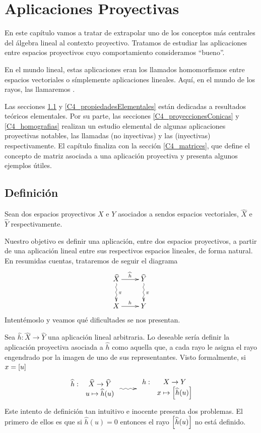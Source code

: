 \chapter{Aplicaciones Proyectivas}
\label{C4}
En este capítulo vamos a tratar de extrapolar uno de los conceptos más centrales del álgebra lineal al contexto proyectivo. Tratamos de estudiar las aplicaciones entre espacios proyectivos cuyo comportamiento consideramos ``bueno''.

En el mundo lineal, estas aplicaciones eran los llamados homomorfismos entre espacios vectoriales o símplemente aplicaciones lineales. Aquí, en el mundo de los rayos, las llamaremos .

Las secciones \ref{C4_definicion} y \ref{C4_propiedadesElementales} están dedicadas a resultados teóricos elementales. Por su parte, las secciones \ref{C4_proyeccionesConicas} y \ref{C4_homografias} realizan un estudio elemental de algunas aplicaciones proyectivas notables, las llamadas  (no inyectivas) y las  (inyectivas) respectivamente. El capítulo finaliza con la sección \ref{C4_matrices}, que define el concepto de matriz asociada a una aplicación proyectiva y presenta algunos ejemplos útiles.
\section{Definición}
\label{C4_definicion}
Sean dos espacios proyectivos $X$ e $Y$ asociados a sendos espacios vectoriales, $\widehat{X}$ e $\widehat{Y}$ respectivamente.

Nuestro objetivo es definir una aplicación, entre dos espacios proyectivos, a partir de una aplicación lineal entre sus respectivos espacios lineales, de forma natural. En resumidas cuentas, trataremos de seguir el diagrama
\[\xymatrix{
	\widehat{X} \ar[r]^{\widehat{h}} \ar@{~>}[d]^{\pi}& \widehat{Y} \ar@{~>}[d]^{\pi}\\
	X \ar[r]^{h}& Y
}
\]
Intentémoslo y veamos qué dificultades se nos presentan.

Sea $\widehat{h}:\widehat{X}\to\widehat{Y}$ una aplicación lineal arbitraria. Lo deseable sería definir la aplicación proyectiva asociada a $\widehat{h}$ como aquella que, a cada rayo le asigna el rayo engendrado por la imagen de uno de sus representantes. Visto formalmente, si $x=\left [ u \right ]$
\[
\xymatrix{
{
\begin{array}{rc}
\widehat{h}:&\widehat{X}\to\widehat{Y}\\
&u\mapsto\widehat{h}(u)
\end{array}
}
\ar@{~>}[r]&
{
\begin{array}{rc}
h: & X\to Y\\
& x\mapsto\class{\widehat{h}(u)}
\end{array}
}
}
\]
Este intento de definición tan intuitivo e inocente presenta dos problemas. El primero de ellos es que si $\widehat{h}(u)=0$ entonces el rayo $\left [ \widehat{h}(u) \right ]$ no está definido.

